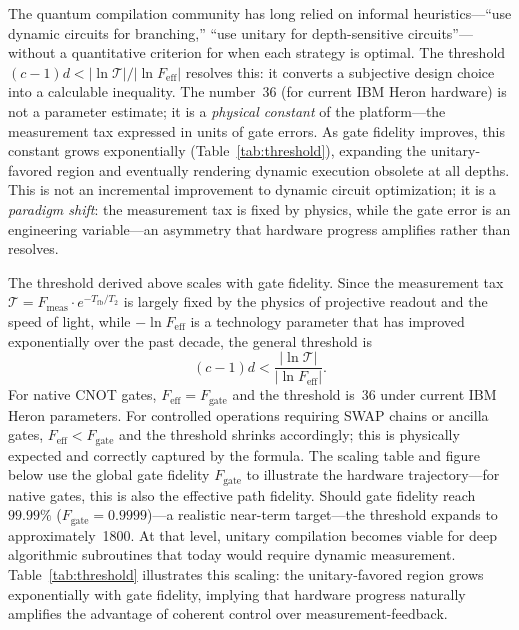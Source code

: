 \documentclass[11pt]{article}
\begin{document}
The quantum compilation community has long relied on informal heuristics---``use dynamic circuits for branching,'' ``use unitary for depth-sensitive circuits''---without a quantitative criterion for when each strategy is optimal.
The threshold $(c{-}1)d < |\ln\mathcal{T}|/|\ln F_{\text{eff}}|$ resolves this: it converts a subjective design choice into a calculable inequality.
The number~36 (for current IBM Heron hardware) is not a parameter estimate; it is a \emph{physical constant} of the platform---the measurement tax expressed in units of gate errors.
As gate fidelity improves, this constant grows exponentially (Table~\ref{tab:threshold}), expanding the unitary-favored region and eventually rendering dynamic execution obsolete at all depths.
This is not an incremental improvement to dynamic circuit optimization; it is a \emph{paradigm shift}: the measurement tax is fixed by physics, while the gate error is an engineering variable---an asymmetry that hardware progress amplifies rather than resolves.

The threshold derived above scales with gate fidelity.
Since the measurement tax $\mathcal{T} = F_{\text{meas}} \cdot e^{-T_{\text{fb}}/T_2}$ is largely fixed by the physics of projective readout and the speed of light, while $-\ln F_{\text{eff}}$ is a technology parameter that has improved exponentially over the past decade, the general threshold is
\begin{equation}
(c-1)d < \frac{|\ln \mathcal{T}|}{|\ln F_{\text{eff}}|}.
\end{equation}
For native CNOT gates, $F_{\text{eff}} = F_{\text{gate}}$ and the threshold is~36 under current IBM Heron parameters.
For controlled operations requiring SWAP chains or ancilla gates, $F_{\text{eff}} < F_{\text{gate}}$ and the threshold shrinks accordingly; this is physically expected and correctly captured by the formula.
The scaling table and figure below use the global gate fidelity $F_{\text{gate}}$ to illustrate the hardware trajectory---for native gates, this is also the effective path fidelity.
Should gate fidelity reach $99.99\%$ ($F_{\text{gate}}=0.9999$)---a realistic near-term target---the threshold expands to approximately~1800.
At that level, unitary compilation becomes viable for deep algorithmic subroutines that today would require dynamic measurement.
Table~\ref{tab:threshold} illustrates this scaling: the unitary-favored region grows exponentially with gate fidelity, implying that hardware progress naturally amplifies the advantage of coherent control over measurement-feedback.
\end{document}

